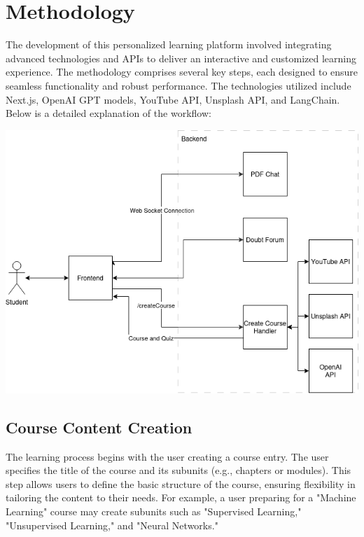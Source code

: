 
\chapter{Methodology}

\label{Chapter3} %

The development of this personalized learning platform involved integrating advanced technologies and APIs to deliver an interactive and customized learning experience. The methodology comprises several key steps, each designed to ensure seamless functionality and robust performance. The technologies utilized include Next.js, OpenAI GPT models, YouTube API, Unsplash API, and LangChain. Below is a detailed explanation of the workflow:

\includegraphics[scale=0.55]{Images/7th sem major project.drawio.png}
\section{Course Content Creation}
The learning process begins with the user creating a course entry. The user specifies the title of the course and its subunits (e.g., chapters or modules). This step allows users to define the basic structure of the course, ensuring flexibility in tailoring the content to their needs. For example, a user preparing for a "Machine Learning" course may create subunits such as "Supervised Learning," "Unsupervised Learning," and "Neural Networks."

